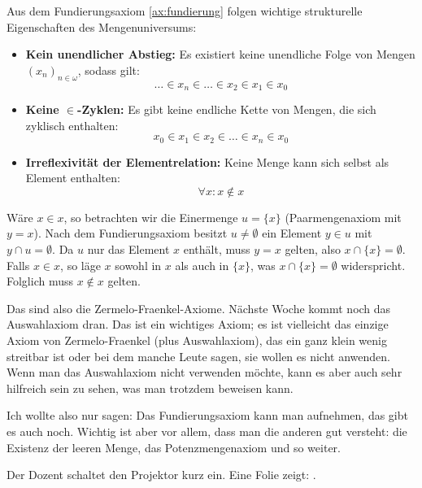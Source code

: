 \begin{math-stroke}
Aus dem Fundierungsaxiom \ref{ax:fundierung} folgen wichtige strukturelle Eigenschaften des Mengenuniversums:
\begin{itemize}
    \item \textbf{Kein unendlicher Abstieg:} Es existiert keine unendliche Folge von Mengen $(x_n)_{n \in \omega}$, sodass gilt:
    \[ \dots \in x_n \in \dots \in x_2 \in x_1 \in x_0 \]
    \item \textbf{Keine $\in$-Zyklen:} Es gibt keine endliche Kette von Mengen, die sich zyklisch enthalten:
    \[ x_0 \in x_1 \in x_2 \in \dots \in x_n \in x_0 \]
    \item \textbf{Irreflexivität der Elementrelation:} Keine Menge kann sich selbst als Element enthalten:
    \[ \forall x \colon x \notin x \]
\end{itemize}

\begin{explanation-of-steps}
Wäre $x \in x$, so betrachten wir die Einermenge $u = \{x\}$ (Paarmengenaxiom mit $y=x$). Nach dem Fundierungsaxiom besitzt $u \neq \emptyset$ ein Element $y \in u$ mit $y \cap u = \emptyset$. Da $u$ nur das Element $x$ enthält, muss $y = x$ gelten, also $x \cap \{x\} = \emptyset$. Falls $x \in x$, so läge $x$ sowohl in $x$ als auch in $\{x\}$, was $x \cap \{x\} = \emptyset$ widerspricht. Folglich muss $x \notin x$ gelten.
\end{explanation-of-steps}
\end{math-stroke}

\begin{spoken-clean}[00:08:22 - 00:09:01]
Das sind also die Zermelo-Fraenkel-Axiome. Nächste Woche kommt noch das Auswahlaxiom dran. Das ist ein wichtiges Axiom; es ist vielleicht das einzige Axiom von Zermelo-Fraenkel (plus Auswahlaxiom), das ein ganz klein wenig streitbar ist oder bei dem manche Leute sagen, sie wollen es nicht anwenden. Wenn man das Auswahlaxiom nicht verwenden möchte, kann es aber auch sehr hilfreich sein zu sehen, was man trotzdem beweisen kann.

Ich wollte also nur sagen: Das Fundierungsaxiom kann man aufnehmen, das gibt es auch noch. Wichtig ist aber vor allem, dass man die anderen gut versteht: die Existenz der leeren Menge, das Potenzmengenaxiom und so weiter.
\end{spoken-clean}

\begin{meta-note}
Der Dozent schaltet den Projektor kurz ein. Eine Folie zeigt: .
\end{meta-note}

